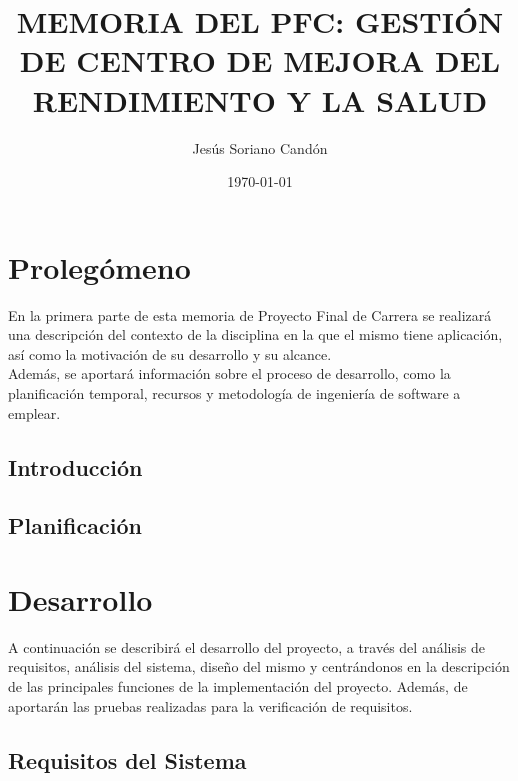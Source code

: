 \documentclass[a4paper,11pt]{book}
\title{MEMORIA DEL PFC: GESTIÓN DE CENTRO DE MEJORA DEL RENDIMIENTO Y LA SALUD}
\author{Jesús Soriano Candón}
\date{\today}
\begin{document}
\pagestyle{plain}


\cleardoublepage


\cleardoublepage


\newpage


\newpage


\frontmatter

\tableofcontents
\listoffigures
\listoftables

\mainmatter

\part{Prolegómeno}
\null\vfill
\noindent En la primera parte de esta memoria de Proyecto Final de Carrera se realizará una descripción del contexto de la disciplina en la que el mismo tiene aplicación, así como la motivación de su desarrollo y su alcance. \\

Además, se aportará información sobre el proceso de desarrollo, como la planificación temporal, recursos y metodología de ingeniería de software a emplear.\\


\chapter{Introducción}


\chapter{Planificación}


\part{Desarrollo}
\null\vfill
\noindent A continuación se describirá el desarrollo del proyecto, a través del análisis de requisitos, análisis del sistema, diseño del mismo y centrándonos en la descripción de las principales funciones de la implementación del proyecto. Además, de aportarán las pruebas realizadas para la verificación de requisitos. \\

\chapter{Requisitos del Sistema}

\end{document}
